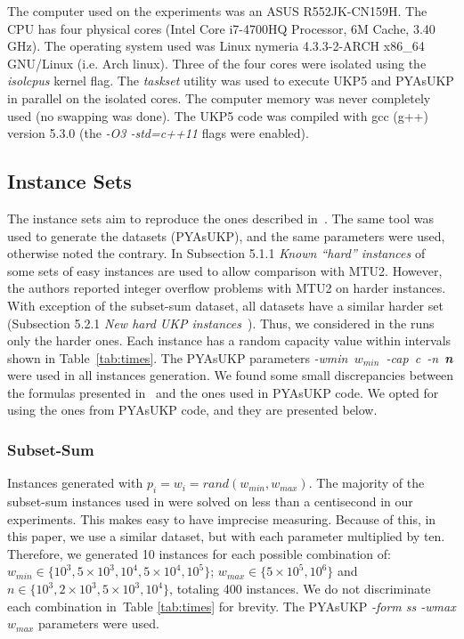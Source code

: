 \documentclass[runningheads,a4paper]{llncs}
\begin{document}
The computer used on the experiments was an ASUS R552JK-CN159H. The CPU has four physical cores (Intel Core i7-4700HQ Processor, 6M Cache, 3.40 GHz). 
The operating system used was Linux nymeria 4.3.3-2-ARCH x86\_64 GNU/Linux (i.e. Arch linux). 
Three of the four cores were isolated using the \emph{isolcpus} kernel flag. 
The \emph{taskset} utility was used to execute UKP5 and PYAsUKP in parallel on the isolated cores. 
The computer memory was never completely used (no swapping was done). 
The UKP5 code was compiled with gcc (g++) version 5.3.0 (the \emph{-O3 -std=c++11} flags were enabled).

\subsection{Instance Sets}

The instance sets aim to reproduce the ones described in~\cite{pya}. 
The same tool was used to generate the datasets (PYAsUKP), and the same parameters were used, otherwise noted the contrary. 
In Subsection 5.1.1 \emph{Known ``hard'' instances} of~\cite{pya} some sets of easy instances are used to allow comparison with MTU2. 
However, the authors reported integer overflow problems with  MTU2 on harder instances. 
With exception of the subset-sum dataset, all datasets have a similar harder set (Subsection 5.2.1 \emph{New hard UKP instances}~\cite{pya}).
Thus, we considered in the runs only the harder ones. 
Each instance has a random capacity value within intervals shown in Table~\ref{tab:times}. 
The PYAsUKP parameters \mbox{\emph{-wmin \(w_{min}\) -cap c -n \textbf{n}}} were used in all instances generation. 
We found some small discrepancies between the formulas presented in~\cite{pya} and the ones used in PYAsUKP code.
We opted for using the ones from  PYAsUKP code, and they are presented below.

\subsubsection{Subset-Sum}\label{sec:subsetsum}
Instances generated with \(p_i = w_i = rand(w_{min}, w_{max})\). 
The majority of the subset-sum instances used in \cite{pya} were solved on less than a centisecond in our experiments. 
This makes easy to have imprecise measuring. 
Because of this, in this paper, we use a similar dataset, but with each parameter multiplied by ten. 
Therefore, we generated 10 instances for each possible combination of: \(w_{min} \in \{10^3, 5\times10^3, 10^4, 5\times10^4, 10^5\}\); \(w_{max} \in \{5\times10^5, 10^6\}\) and \(n \in \{10^3, 2\times10^3, 5\times10^3, 10^4\}\), totaling 400 instances. We do not discriminate each combination in~Table \ref{tab:times} for brevity. The PYAsUKP \emph{-form ss -wmax \(w_{max}\)} parameters were used.
\end{document}
